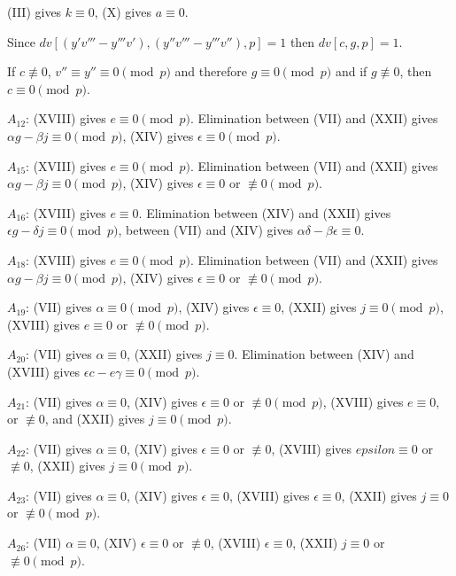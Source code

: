 \documentclass[oneside]{article}
\begin{document}
(III) gives $k\equiv 0$, (X) gives $a \equiv 0$.

Since $dv[(y'v''' - y'''v'), (y''v''' - y'''v''), p] = 1$ then $dv[c, g, p]
= 1$.

If $c \not\equiv 0$, $v'' \equiv y'' \equiv 0 \pmod{p}$ and therefore $g
\equiv 0 \pmod{p}$ and if $g \not\equiv 0$, then $c \equiv 0 \pmod{p}$.

\smallskip
$A_{12}$: (XVIII) gives $e \equiv 0 \pmod{p}$. Elimination between (VII)
and (XXII) gives $\alpha g - \beta j \equiv 0 \pmod{p}$, (XIV) gives
$\epsilon \equiv 0 \pmod{p}$.

\smallskip
$A_{15}$: (XVIII) gives $e \equiv 0 \pmod{p}$. Elimination between (VII)
and (XXII) gives $\alpha g - \beta j \equiv 0 \pmod{p}$, (XIV) gives
$\epsilon \equiv 0$ or $\not\equiv 0 \pmod{p}$.

\smallskip
$A_{16}$: (XVIII) gives $e \equiv 0$. Elimination between (XIV) and (XXII)
gives $\epsilon g - \delta j \equiv 0 \pmod{p}$, between (VII) and (XIV)
gives $\alpha\delta - \beta\epsilon \equiv 0$.

\smallskip
$A_{18}$: (XVIII) gives $e \equiv 0 \pmod{p}$. Elimination between (VII)
and (XXII) gives $\alpha g - \beta j \equiv 0 \pmod{p}$, (XIV) gives
$\epsilon \equiv 0$ or $\not\equiv 0 \pmod{p}$.

\smallskip
$A_{19}$: (VII) gives $\alpha \equiv 0 \pmod{p}$, (XIV) gives $\epsilon
\equiv 0$, (XXII) gives $j \equiv 0 \pmod{p}$, (XVIII) gives $e \equiv 0$
or $\not\equiv 0 \pmod{p}$.

\smallskip
$A_{20}$: (VII) gives $\alpha \equiv 0$, (XXII) gives $j \equiv 0$.
Elimination between (XIV) and (XVIII) gives $\epsilon c - e\gamma \equiv 0
\pmod{p}$.

\smallskip
$A_{21}$: (VII) gives $\alpha\equiv 0$, (XIV) gives $\epsilon \equiv 0$
or $\not\equiv 0 \pmod{p}$, (XVIII) gives $e \equiv 0,$ or
$\not\equiv 0$, and (XXII) gives $j \equiv 0 \pmod{p}$.

\smallskip
$A_{22}$: (VII) gives $\alpha \equiv 0$, (XIV) gives $\epsilon \equiv 0$
or $\not\equiv 0$, (XVIII) gives $epsilon \equiv 0$ or $\not\equiv 0$,
(XXII) gives $j \equiv 0 \pmod{p}$.

\smallskip
$A_{23}$: (VII) gives $\alpha \equiv 0$, (XIV) gives $\epsilon \equiv 0$,
(XVIII) gives $\epsilon \equiv 0$, (XXII) gives $j \equiv 0$ or
$\not\equiv 0 \pmod{p}$.

\smallskip
$A_{26}$: (VII) $\alpha \equiv 0$, (XIV) $\epsilon \equiv 0$ or
$\not\equiv 0$, (XVIII) $\epsilon \equiv 0$, (XXII) $j \equiv 0$ or
$\not\equiv 0 \pmod{p}$.
\end{document}
